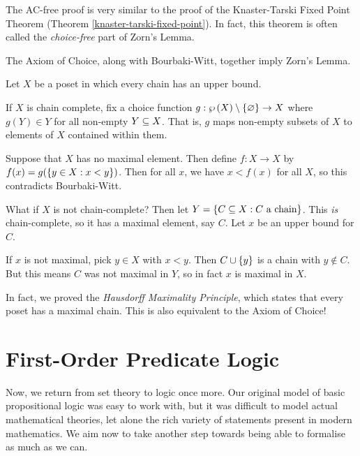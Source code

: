 \documentclass{article}
\begin{document}
\begin{note}
	The AC-free proof is very similar to the proof of the Knaster-Tarski Fixed Point Theorem (Theorem \ref{knaster-tarski-fixed-point}). In fact, this theorem is often called the \textit{choice-free} part of Zorn's Lemma.
\end{note}

\begin{theorem}[AC + BW $\Ra$ ZL]
    The Axiom of Choice, along with Bourbaki-Witt, together imply Zorn's Lemma.
\end{theorem}

\begin{prf}
    Let $X$ be a poset in which every chain has an upper bound.
    
    If $X$ is chain complete, fix a choice function $g : \wp\left(X\right) \setminus \left\lbrace \varnothing \right\rbrace \to X$ where $g(Y) \in Y$ for all non-empty $Y \subseteq X$. That is, $g$ maps non-empty subsets of $X$ to elements of $X$ contained within them.
    
    Suppose that $X$ has no maximal element. Then define $f : X \to X$ by $f(x) = g(\left\lbrace y \in X : x < y \right\rbrace)$. Then for all $x$, we have $x < f(x)$ for all $X$, so this contradicts Bourbaki-Witt.
    
    What if $X$ is not chain-complete? Then let $Y = \left\lbrace C \subseteq X : C \text{ a chain} \right\rbrace$. This \textit{is} chain-complete, so it has a maximal element, say $C$. Let $x$ be an upper bound for $C$.
    
    If $x$ is not maximal, pick $y \in X$ with $x < y$. Then $C \cup \left\lbrace y \right\rbrace$ is a chain with $y \notin C$. But this means $C$ was not maximal in $Y$, so in fact $x$ is maximal in $X$.
\end{prf}

\begin{note}
	In fact, we proved the \textit{Hausdorff Maximality Principle}, which states that every poset has a maximal chain. This is also equivalent to the Axiom of Choice!
\end{note}


\pagebreak
\section{First-Order Predicate Logic}

Now, we return from set theory to logic once more. Our original model of basic propositional logic was easy to work with, but it was difficult to model actual mathematical theories, let alone the rich variety of statements present in modern mathematics. We aim now to take another step towards being able to formalise as much as we can.
\end{document}

